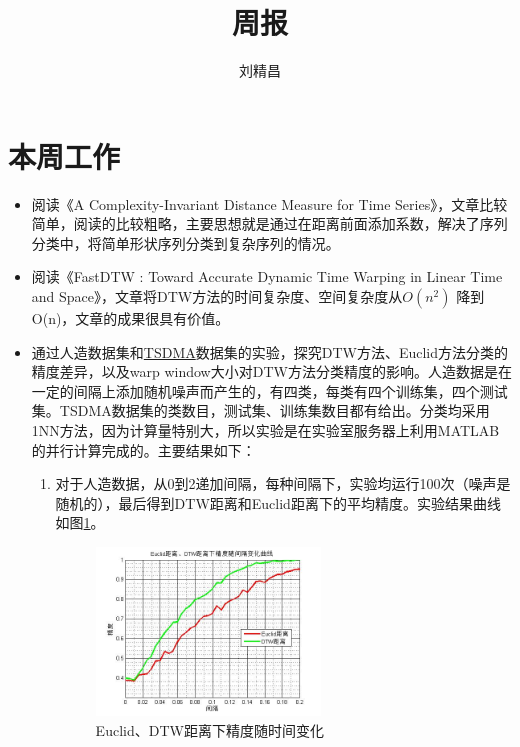 \documentclass{ctexart}
\begin{document}
\title{周报}
\author{刘精昌}
\maketitle

\fangsong
\section*{本周工作}
\begin{itemize}
  \item 阅读《A Complexity-Invariant Distance Measure for Time Series》，文章比较简单，阅读的比较粗略，主要思想就是通过在距离前面添加系数，解决了序列分类中，将简单形状序列分类到复杂序列的情况。
  \item 阅读《FastDTW : Toward Accurate Dynamic Time Warping in Linear Time and Space》，文章将DTW方法的时间复杂度、空间复杂度从$O\left( n^2 \right)$ 降到 O(n)，文章的成果很具有价值。
  \item 通过人造数据集和\href{http://www.cs.ucr.edu/~eamonn/time_series_data/}{TSDMA}数据集的实验，探究DTW方法、Euclid方法分类的精度差异，以及warp window大小对DTW方法分类精度的影响。人造数据是在一定的间隔上添加随机噪声而产生的，有四类，每类有四个训练集，四个测试集。TSDMA数据集的类数目，测试集、训练集数目都有给出。分类均采用1NN方法，因为计算量特别大，所以实验是在实验室服务器上利用MATLAB的并行计算完成的。主要结果如下：
      \begin{enumerate}
        \item 对于人造数据，从0到2递加间隔，每种间隔下，实验均运行100次（噪声是随机的），最后得到DTW距离和Euclid距离下的平均精度。实验结果曲线如图\ref{fig:1}。
            \begin{figure}
              \centering
              \includegraphics[width=0.6\textwidth]{1.jpg}
              \caption{Euclid、DTW距离下精度随时间变化}\label{fig:1}
            \end{figure}



\end{enumerate}
\end{itemize}
\end{document}
